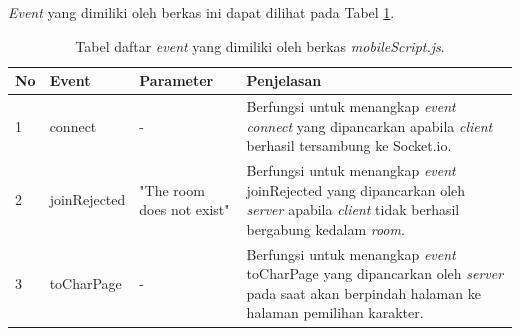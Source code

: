 \begin{enumerate}
\begin{enumerate}
\begin{enumerate}
			\textit{Event} yang dimiliki oleh berkas ini dapat dilihat pada Tabel \ref{table:event_mobileScript}.
			\begin{table}[H]
				\centering
				\caption{Tabel daftar \textit{event} yang dimiliki oleh berkas \textit{mobileScript.js}.}
				\begin{tabular}{|p{0.35cm}|p{3cm}|p{3cm}|p{7cm}|}
					\hline
					No & Event & Parameter & Penjelasan \\ \hline
					1 & connect & - & Berfungsi untuk menangkap \textit{event} \textit{connect} yang dipancarkan apabila \textit{client} berhasil tersambung ke Socket.io. \\ \hline
					2 & joinRejected & "The room does not exist" & Berfungsi untuk menangkap \textit{event} joinRejected yang dipancarkan oleh \textit{server} apabila \textit{client} tidak berhasil bergabung kedalam \textit{room}. \\ \hline
					3 & toCharPage & - & Berfungsi untuk menangkap \textit{event} toCharPage yang dipancarkan oleh \textit{server} pada saat akan berpindah halaman ke halaman pemilihan karakter. \\ \hline
				\end{tabular}
				\label{table:event_mobileScript}
			\end{table}
%				
%				
%				
			

\end{enumerate}
\end{enumerate}
\end{enumerate}
